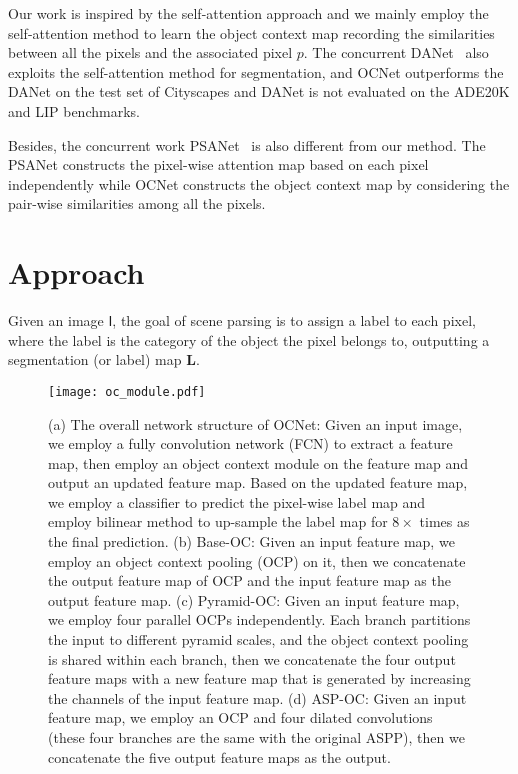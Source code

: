 \documentclass[10pt,twocolumn,letterpaper]{article}
\begin{document}
Our work is inspired by the self-attention approach and we mainly employ the self-attention method to learn the object context map recording the similarities between all the pixels and the associated pixel $p$.
The concurrent DANet~\cite{fu2018dual} also exploits the self-attention method for segmentation, and OCNet outperforms the DANet on the
test set of Cityscapes and DANet is not evaluated on the ADE20K and LIP benchmarks.

Besides, the concurrent work PSANet~\cite{psanet} is also different from our method. The PSANet constructs the pixel-wise attention map based on each pixel independently while OCNet constructs the object context map by considering the pair-wise similarities among all the pixels.

\section{Approach}
Given an image $\mathsf{I}$,
the goal of scene parsing is to
assign a label to each pixel,
where the label is the category
of the object the pixel belongs to,
outputting a segmentation (or label) map $\mathbf{L}$.

\begin{figure*}[t]
\hspace{-0.5cm}
\texttt{[image: oc\_module.pdf]}
\caption{\small{
(a) The overall network structure of OCNet: Given an input image, we employ a fully convolution network (FCN) to extract a feature map, then employ an object context module on the feature map and output an updated feature map. Based on the updated feature map, we employ a classifier to predict the pixel-wise label map and employ bilinear method to up-sample the label map for $8 \times$ times as the final prediction.
(b) Base-OC: Given an input feature map, we employ an object context pooling (OCP) on it, then we concatenate the output feature map of OCP and the input feature map as the output feature map.
(c) Pyramid-OC: Given an input feature map, we employ four parallel OCPs independently. Each branch partitions the input to different pyramid scales, and the object context pooling is shared within each branch, then we concatenate the four output feature maps with a new feature map that is generated by increasing the channels of the input feature map.
(d) ASP-OC: Given an input feature map, we employ an OCP and four dilated convolutions (these four branches are the same with the original ASPP), then we concatenate the five output feature maps as the output.}}
\label{fig:OCNet_pipeline}
\end{figure*}
\end{document}
